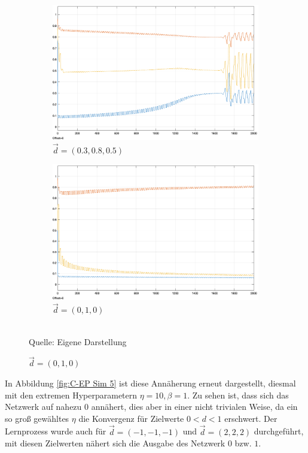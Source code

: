 \begin{figure}[h]
  \caption{Simulationen des \ac{c-ep} mit \(\beta=1,\eta=0.5\). Dargestellt ist die Ausgabe des Netzwerks}
  \centering
  \begin{subfigure}[b]{0.5\textwidth}
    \includegraphics[width=\textwidth]{abbildungen/c_ep_sim_1_ausgabe.png}
    \caption{\(\vec{d}=(0.3,0.8,0.5)\)}
  \end{subfigure}%
  \hfill
  \begin{subfigure}[b]{0.5\textwidth}
    \includegraphics[width=\textwidth]{abbildungen/c_ep_sim_2_ausgabe.png}
    \caption{\(\vec{d}=(0,1,0)\)}
  \end{subfigure}
  \\
  Quelle: Eigene Darstellung
  \label{fig:C-EP Sim 1,2}
\end{figure}

In Abbildung \ref{fig:C-EP Sim 5} ist diese Annäherung erneut dargestellt, diesmal mit den extremen Hyperparametern \(\eta=10,\beta=1\). Zu sehen ist, dass sich das Netzwerk auf nahezu \(0\) annähert, dies aber in einer nicht trivialen Weise, da ein so groß gewähltes \(\eta\) die Konvergenz für Zielwerte \(0<d<1\) erschwert. Der Lernprozess wurde auch für \(\vec{d}=(-1,-1,-1)\) und \(\vec{d}=(2,2,2)\) durchgeführt, mit diesen Zielwerten nähert sich die Ausgabe des Netzwerk \(0\) bzw. \(1\).

